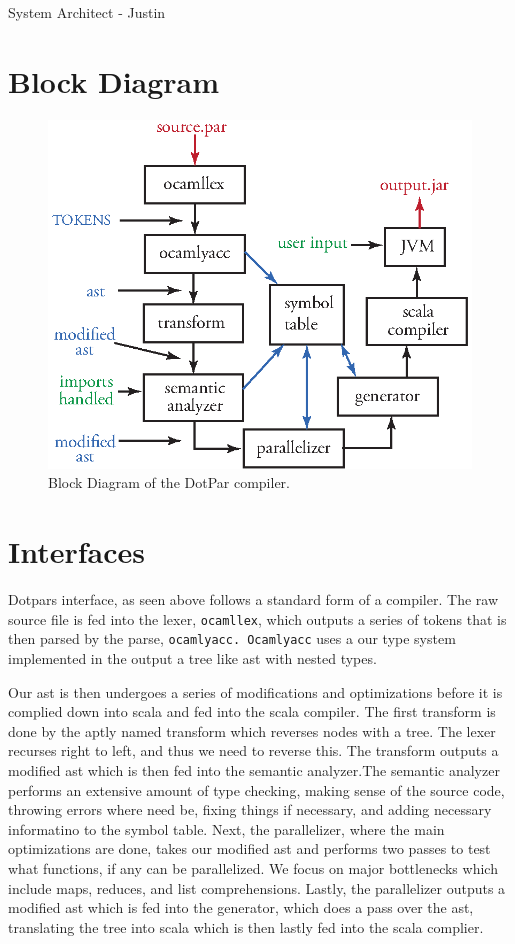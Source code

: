 System Architect - Justin

\section{Block Diagram}
\begin{figure}[H]
\centering
\includegraphics[scale=1]{blockdiagram.eps} 
\caption{Block Diagram of the DotPar compiler.}
\end{figure}

\section{Interfaces}
Dotpars interface, as seen above follows a standard form of a
compiler. The raw source file is fed into the lexer, \verb=ocamllex=,
which outputs a series of tokens that is then parsed by the parse,
\verb=ocamlyacc. Ocamlyacc= uses a our type system implemented in the
output a tree like ast with nested types.

Our ast is then undergoes a series of modifications and optimizations
before it is complied down into scala and fed into the scala compiler.
The first transform is done by the aptly named transform which
reverses nodes with a tree.  The lexer recurses right to left, and
thus we need to reverse this.  The transform outputs a modified ast
which is then fed into the semantic analyzer.The semantic analyzer
performs an extensive amount of type checking, making sense of the
source code, throwing errors where need be, fixing things if
necessary, and adding necessary informatino to the symbol table.
Next, the parallelizer, where the main optimizations are done, takes
our modified ast and performs two passes to test what functions, if
any can be parallelized. We focus on major bottlenecks which include
maps, reduces, and list comprehensions. Lastly, the parallelizer
outputs a modified ast which is fed into the generator, which does a
pass over the ast, translating the tree into scala which is then
lastly fed into the scala complier.

